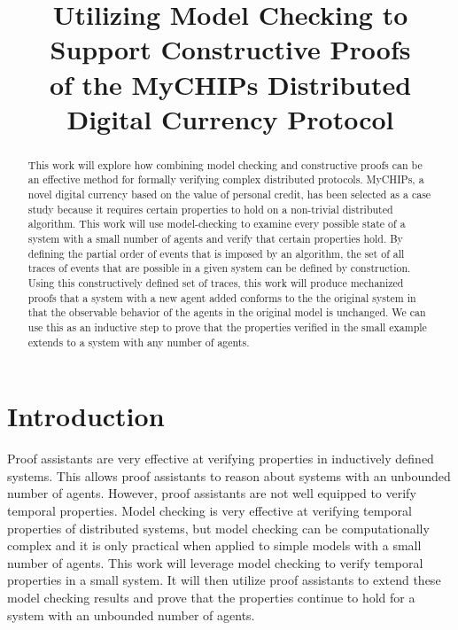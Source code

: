 \documentclass[article, onecolumn, 12pt]{IEEEtran}
\begin{document}
\title{Utilizing Model Checking to Support Constructive Proofs\\
of the MyCHIPs Distributed Digital Currency Protocol}

\author{
}

\maketitle

\begin{abstract}
This work will explore how combining model checking and constructive proofs can be an effective method for formally verifying complex distributed protocols. MyCHIPs, a novel digital currency based on the value of personal credit\cite{bateman_myCHIPs}, has been selected as a case study because it requires certain properties to hold on a non-trivial distributed algorithm. 
This work will use model-checking to examine every possible state of a system with a small number of agents and verify that certain properties hold. By defining the partial order of events that is imposed by an algorithm, the set of all traces of events that are possible in a given system can be defined by construction. Using this constructively defined set of traces, this work will produce mechanized proofs that a system with a new agent added conforms to the the original system in that the observable behavior of the agents in the original model is unchanged. We can use this as an inductive step to prove that the properties verified in the small example extends to a system with any number of agents. 

\end{abstract}

\section{Introduction}
Proof assistants are very effective at verifying properties in inductively defined systems. This allows proof assistants to reason about systems with an unbounded number of agents. However, proof assistants are not well equipped to verify temporal properties.
Model checking is very effective at verifying temporal properties of distributed systems, but model checking can be computationally complex and it is only practical when applied to simple models with a small number of agents. This work will leverage model checking to verify temporal properties in a small system. It will then utilize proof assistants to extend these model checking results and prove that the properties continue to hold for a system with an unbounded number of agents. 
\end{document}
